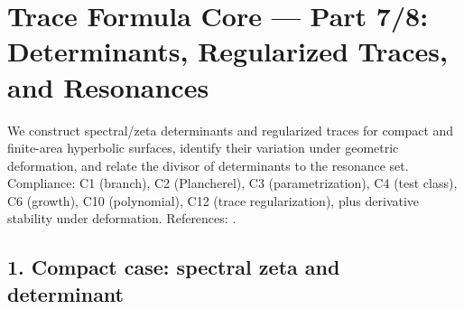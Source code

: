 
\section*{Trace Formula Core — Part 7/8: Determinants, Regularized Traces, and Resonances}\relax\hspace{0pt}
\label{sec:tfc-part7} %

\noindent
We construct spectral/zeta determinants and regularized traces for compact and finite-area hyperbolic surfaces, identify their variation under geometric deformation, and relate the divisor of determinants to the resonance set. \relax\hspace{0pt}
Compliance: C1 (branch), C2 (Plancherel), C3 (parametrization), C4 (test class), C6 (growth), C10 (polynomial), C12 (trace regularization), plus derivative stability under deformation. \relax\hspace{0pt}
References: \cite{MinakshisundaramPleijel,Seeley,RaySinger,Muller,HeJi,ParkinsSarnak,Borthwick,GuillopeZworski,HejhalII}. %

\subsection*{1. Compact case: spectral zeta and determinant}\relax\hspace{0pt}
\label{subsec:tfc7-compact} %

